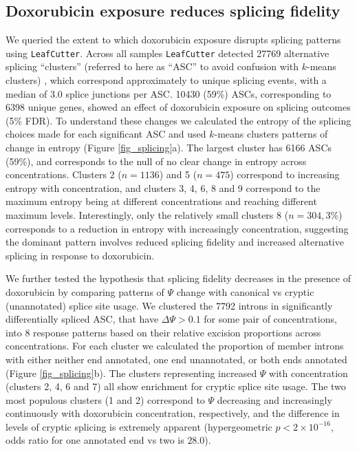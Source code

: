 \documentclass{article}
\begin{document}
{\subsection*{Doxorubicin exposure reduces splicing fidelity}


We queried the extent to which doxorubicin exposure disrupts splicing patterns using \texttt{LeafCutter}\cite{leafcutter}. Across all samples \texttt{LeafCutter} detected 27769 alternative splicing ``clusters'' (referred to here as ``ASC'' to avoid confusion with $k$-means clusters) , which correspond approximately to unique splicing events, with a median of 3.0 splice junctions per ASC. 10430 (59\%) ASCs, corresponding to 6398 unique genes, showed an effect of doxorubicin exposure on splicing outcomes (5\% FDR). To understand these changes we calculated the entropy of the splicing choices made for each significant ASC and used $k$-means clusters patterns of change in entropy (Figure \ref{fig_splicing}a). The largest cluster has 6166 ASCs (59\%), and corresponds to the null of no clear change in entropy across concentrations. Clusters 2 ($n=1136$) and 5 ($n=475$) correspond to increasing entropy with concentration, and clusters 3, 4, 6, 8 and 9 correspond to the maximum entropy being at different concentrations and reaching different maximum levels. Interestingly, only the relatively small clusters 8 ($n=304, 3\%$) corresponds to a reduction in entropy with increasingly concentration, suggesting the dominant pattern involves reduced splicing fidelity and increased alternative splicing in response to doxorubicin. 

We further tested the hypothesis that splicing fidelity decreases in the presence of doxorubicin by comparing patterns of $\Psi$ change with canonical vs cryptic (unannotated) splice site usage. We clustered the 7792 introns in significantly differentially spliced ASC, that have $\Delta \Psi > 0.1$ for some pair of concentrations, into 8 response patterns based on their relative excision proportions across concentrations. For each cluster we calculated the proportion of member introns with either neither end annotated, one end unannotated, or both ends annotated (Figure \ref{fig_splicing}b). The clusters representing increased $\Psi$ with concentration (clusters 2, 4, 6 and 7) all show enrichment for cryptic splice site usage. The two most populous clusters (1 and 2) correspond to $\Psi$ decreasing and increasingly continuously with doxorubicin concentration, respectively, and the difference in levels of cryptic splicing is extremely apparent (hypergeometric $p < 2 \times 10^{-16}$, odds ratio for one annotated end vs two is $28.0$).

}
\end{document}
